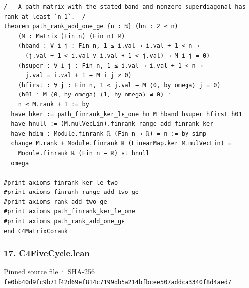 \documentclass[11pt,a4paper]{article}
\begin{document}
\begin{Verbatim}[breaklines,breakanywhere,fontsize=\footnotesize]
/-- A path matrix with the stated band and nonzero superdiagonal has rank at least `n-1`. -/
theorem path_rank_add_one_ge {n : ℕ} (hn : 2 ≤ n)
    (M : Matrix (Fin n) (Fin n) ℝ)
    (hband : ∀ i j : Fin n, 1 ≤ i.val → i.val + 1 < n →
      (j.val + 1 < i.val ∨ i.val + 1 < j.val) → M i j = 0)
    (hsuper : ∀ i j : Fin n, 1 ≤ i.val → i.val + 1 < n →
      j.val = i.val + 1 → M i j ≠ 0)
    (hfirst : ∀ j : Fin n, 1 < j.val → M ⟨0, by omega⟩ j = 0)
    (h01 : M ⟨0, by omega⟩ ⟨1, by omega⟩ ≠ 0) :
    n ≤ M.rank + 1 := by
  have hker := path_finrank_ker_le_one hn M hband hsuper hfirst h01
  have hnull := (M.mulVecLin).finrank_range_add_finrank_ker
  have hdim : Module.finrank ℝ (Fin n → ℝ) = n := by simp
  change M.rank + Module.finrank ℝ (LinearMap.ker M.mulVecLin) =
    Module.finrank ℝ (Fin n → ℝ) at hnull
  omega

#print axioms finrank_ker_le_two
#print axioms finrank_range_add_two_ge
#print axioms rank_add_two_ge
#print axioms path_finrank_ker_le_one
#print axioms path_rank_add_one_ge
end C4MatrixCorank
\end{Verbatim}

\subsubsection{17. C4FiveCycle.lean}\label{c4fivecycle.lean}

\href{https://github.com/mpelteshki/climbing-to-the-frontier/blob/29fbb70da18564048f62492e43870f2f96a65463/cagent/p1/C4FiveCycle.lean}{Pinned source file} · SHA-256 \texttt{fe0bb40d\allowbreak{}9fc9b71f\allowbreak{}42d69ef8\allowbreak{}14c7199d\allowbreak{}b5a214bf\allowbreak{}bcee507a\allowbreak{}ddca3340\allowbreak{}f8d4aed7}
\end{document}
